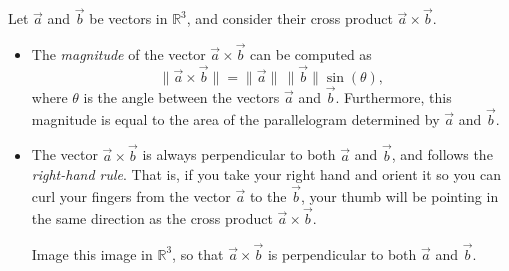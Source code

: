\documentclass{ximera}
\begin{document}
\begin{proposition}
Let $\vec{a}$ and $\vec{b}$ be vectors in $\mathbb{R}^3$, and consider their cross product $\vec{a}\times\vec{b}$.
\begin{itemize}
\item The \emph{magnitude} of the vector $\vec{a}\times\vec{b}$ can be computed as 
\[
\|\vec{a}\times\vec{b}\| = \|\vec{a}\|\,\|\vec{b}\|\sin(\theta),
\]
where $\theta$ is the angle between the vectors $\vec{a}$ and $\vec{b}$. Furthermore, this magnitude is equal to the area of the parallelogram determined by $\vec{a}$ and $\vec{b}$.

\begin{image}
\end{image}

\item The vector $\vec{a}\times\vec{b}$ is always perpendicular to both $\vec{a}$ and $\vec{b}$, and follows the \emph{right-hand rule}. That is, if you take your right hand and orient it so you can curl your fingers from the vector $\vec{a}$ to the $\vec{b}$, your thumb will be pointing in the same direction as the cross product $\vec{a}\times\vec{b}$.

\begin{image}
\end{image}

Image this image in $\mathbb{R}^3$, so that $\vec{a}\times\vec{b}$ is perpendicular to both $\vec{a}$ and $\vec{b}$.

\end{itemize}
\end{proposition}
\end{document}
